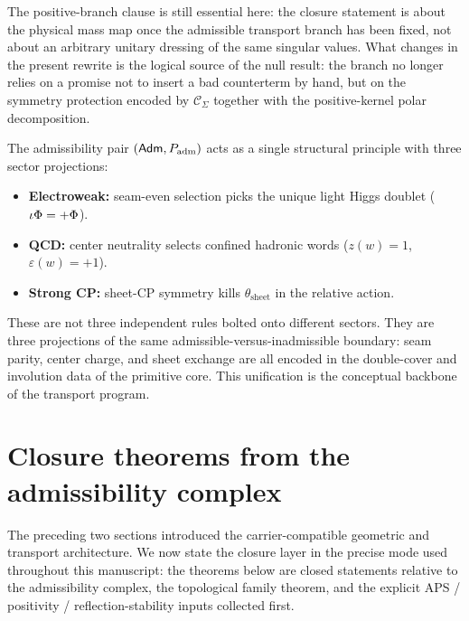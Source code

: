 The positive-branch clause is still essential here: the closure statement is about the physical mass map once the admissible transport branch has been fixed, not about an arbitrary unitary dressing of the same singular values. What changes in the present rewrite is the logical source of the null result: the branch no longer relies on a promise not to insert a bad counterterm by hand, but on the symmetry protection encoded by $\mathcal C_\Sigma$ together with the positive-kernel polar decomposition.

\begin{remark}
The admissibility pair $(\mathsf{Adm},P_{\mathrm{adm}})$ acts as a single structural principle with three sector projections:
\begin{itemize}[leftmargin=1.5em, topsep=3pt, itemsep=2pt]
    \item \textbf{Electroweak:} seam-even selection picks the unique light Higgs doublet ($\iota\Phi=+\Phi$).
    \item \textbf{QCD:} center neutrality selects confined hadronic words ($z(w)=1$, $\varepsilon(w)=+1$).
    \item \textbf{Strong CP:} sheet-CP symmetry kills $\theta_{\mathrm{sheet}}$ in the relative action.
\end{itemize}
These are not three independent rules bolted onto different sectors. They are three projections of the same admissible-versus-inadmissible boundary: seam parity, center charge, and sheet exchange are all encoded in the double-cover and involution data of the primitive core. This unification is the conceptual backbone of the transport program.
\end{remark}

\section{Closure theorems from the admissibility complex}
\label{sec:closure-theorems}

The preceding two sections introduced the carrier-compatible geometric and transport architecture. We now state the closure layer in the precise mode used throughout this manuscript: the theorems below are closed statements relative to the admissibility complex, the topological family theorem, and the explicit APS / positivity / reflection-stability inputs collected first.

